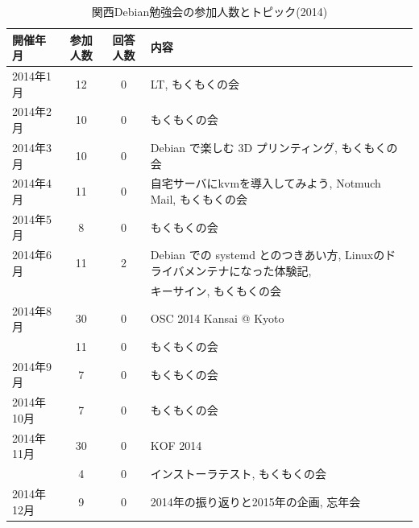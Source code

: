 \documentclass[mingoth,a4paper]{jsarticle}
\begin{document}
\begin{table}
    \caption{関西Debian勉強会の参加人数とトピック(2014)}
    \label{tab:count2014kansai}
    \begin{center}
      \begin{tabular}{|l|c|c|l|}
        \hline
        開催年月  & 参加人数 & 回答人数 & 内容 \\
        \hline
        2014年1月 &12        &0         & LT, もくもくの会 \\
        2014年2月 &10        &0         & もくもくの会 \\
        2014年3月 &10        &0         & Debian で楽しむ 3D プリンティング, もくもくの会 \\
        2014年4月 &11        &0         & 自宅サーバにkvmを導入してみよう, Notmuch Mail, もくもくの会 \\
        2014年5月 & 8        &0         & もくもくの会 \\
        2014年6月 &11        &2         & Debian での systemd とのつきあい方, Linuxのドライバメンテナになった体験記, \\
                  &          &          & キーサイン, もくもくの会 \\
        2014年8月 &30        &0         & OSC 2014 Kansai @ Kyoto \\
                  &11        &0         & もくもくの会 \\
        2014年9月 & 7        &0         & もくもくの会 \\
        2014年10月& 7        &0         & もくもくの会 \\
        2014年11月&30        &0         & KOF 2014 \\
                  & 4        &0         & インストーラテスト, もくもくの会 \\
        2014年12月& 9        &0         & 2014年の振り返りと2015年の企画, 忘年会 \\
        \hline
      \end{tabular}
    \end{center}
\end{table}


\end{document}
